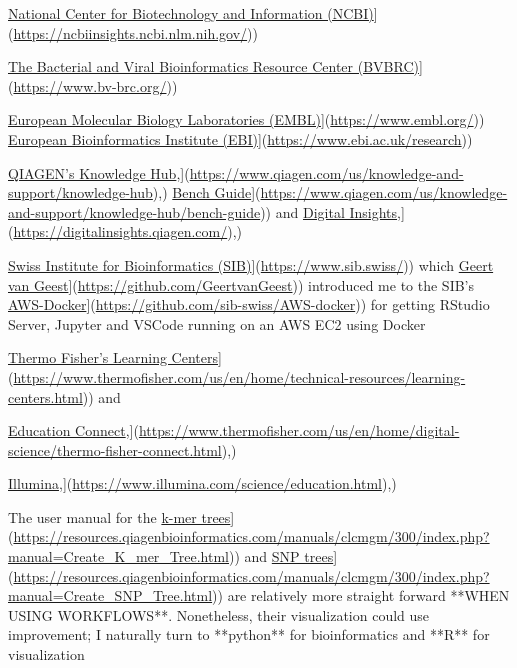 \documentclass[
]{book}
\begin{document}
\href{\%5Bhttps://ncbiinsights.ncbi.nlm.nih.gov/}{National Center for Biotechnology and Information (NCBI)}{]}(\url{https://ncbiinsights.ncbi.nlm.nih.gov/}))

\href{\%5Bhttps://www.bv-brc.org/}{The Bacterial and Viral Bioinformatics Resource Center (BVBRC)}{]}(\url{https://www.bv-brc.org/}))

\href{\%5Bhttps://www.embl.org/}{European Molecular Biology Laboratories (EMBL)}{]}(\url{https://www.embl.org/})) \href{\%5Bhttps://www.ebi.ac.uk/research}{European Bioinformatics Institute (EBI)}{]}(\url{https://www.ebi.ac.uk/research}))

\href{\%5Bhttps://www.qiagen.com/us/knowledge-and-support/knowledge-hub}{QIAGEN's Knowledge Hub},{]}(\url{https://www.qiagen.com/us/knowledge-and-support/knowledge-hub}),) \href{\%5Bhttps://www.qiagen.com/us/knowledge-and-support/knowledge-hub/bench-guide}{Bench Guide}{]}(\url{https://www.qiagen.com/us/knowledge-and-support/knowledge-hub/bench-guide})) and \href{\%5Bhttps://digitalinsights.qiagen.com/}{Digital Insights},{]}(\url{https://digitalinsights.qiagen.com/}),)

\href{\%5Bhttps://www.sib.swiss/}{Swiss Institute for Bioinformatics (SIB)}{]}(\url{https://www.sib.swiss/})) which \href{\%5Bhttps://github.com/GeertvanGeest}{Geert van Geest}{]}(\url{https://github.com/GeertvanGeest})) introduced me to the SIB's \href{\%5Bhttps://github.com/sib-swiss/AWS-docker}{AWS-Docker}{]}(\url{https://github.com/sib-swiss/AWS-docker})) for getting RStudio Server, Jupyter and VSCode running on an AWS EC2 using Docker

\href{\%5Bhttps://www.thermofisher.com/us/en/home/technical-resources/learning-centers.html}{Thermo Fisher's Learning Centers}{]}(\url{https://www.thermofisher.com/us/en/home/technical-resources/learning-centers.html})) and

\href{\%5Bhttps://www.thermofisher.com/us/en/home/digital-science/thermo-fisher-connect.html}{Education Connect},{]}(\url{https://www.thermofisher.com/us/en/home/digital-science/thermo-fisher-connect.html}),)

\href{\%5Bhttps://www.illumina.com/science/education.html}{Illumina},{]}(\url{https://www.illumina.com/science/education.html}),)

The user manual for the \href{\%5Bhttps://resources.qiagenbioinformatics.com/manuals/clcmgm/300/index.php?manual=Create_K_mer_Tree.html}{k-mer trees}{]}(\url{https://resources.qiagenbioinformatics.com/manuals/clcmgm/300/index.php?manual=Create_K_mer_Tree.html})) and \href{\%5Bhttps://resources.qiagenbioinformatics.com/manuals/clcmgm/300/index.php?manual=Create_SNP_Tree.html}{SNP trees}{]}(\url{https://resources.qiagenbioinformatics.com/manuals/clcmgm/300/index.php?manual=Create_SNP_Tree.html})) are relatively more straight forward **WHEN USING WORKFLOWS**. Nonetheless, their visualization could use improvement; I naturally turn to **python** for bioinformatics and **R** for visualization
\end{document}
